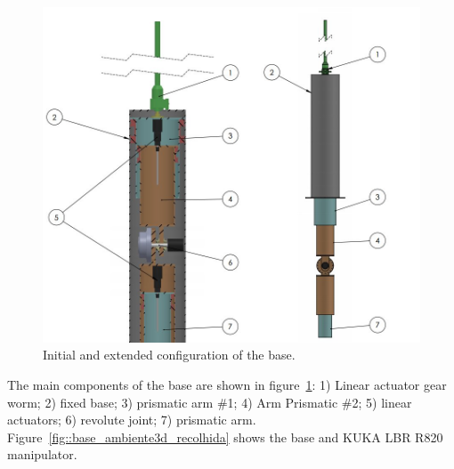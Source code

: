 \begin{figure}[h!]
\centering
	\includegraphics[width=\columnwidth]{figs/estudo/solid/baselbr.jpg} 
	\caption{Initial and extended configuration of the base.}
	\label{fig::baselbr}
\end{figure}



The main components of the base are shown in figure~\ref{fig::baselbr}: 1) Linear actuator gear worm;
2) fixed base; 3) prismatic arm \#1; 4) Arm Prismatic \#2; 5) linear actuators;
6) revolute joint; 7) prismatic arm. Figure~\ref{fig::base_ambiente3d_recolhida} shows the base and KUKA LBR
R820 manipulator.


